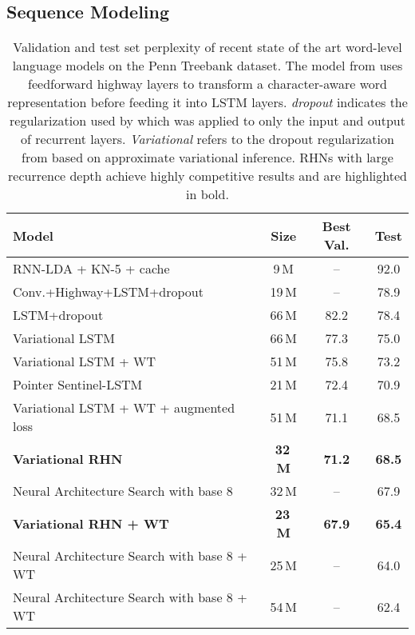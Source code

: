 \documentclass[letterpaper]{article}
\begin{document}
\subsection{Sequence Modeling}
\begin{table*}[t]
\centering
      \caption{Validation and test set perplexity of recent state of the art word-level language models on the Penn Treebank dataset. The model from \citet{kim2015} uses feedforward highway layers to transform a character-aware word representation before feeding it into LSTM layers. \emph{dropout} indicates the regularization used by \citet{zaremba} which was applied to only the input and output of recurrent layers. \emph{Variational} refers to the dropout regularization from \citet{gal2015} based on approximate variational inference. RHNs with large recurrence depth achieve highly competitive results and are highlighted in bold.}
      \vspace{2mm}
      \label{tab:sota-ptb}
      {\small
      \begin{tabular}{lccc}
        \toprule
        \textbf{Model} & \textbf{Size}  & \textbf{Best Val.} & \textbf{Test} \\ 
        \midrule
        RNN-LDA + KN-5 + cache \citep{mikolov2012context} & 9\,M & -- & 92.0 \\
        Conv.+Highway+LSTM+dropout \citep{kim2015} & 19\,M  & --    & 78.9\\
        LSTM+dropout \citep{zaremba}           & 66\,M  & 82.2  & 78.4\\ 
        Variational LSTM \citep{gal2015}       & 66\,M  & 77.3  & 75.0\\
        Variational LSTM + WT \citep{weight_tying} & 51\,M & 75.8 & 73.2 \\
        Pointer Sentinel-LSTM \citep{pointer_sentinel_salesforce} & 21\,M & 72.4 & 70.9\\
Variational LSTM + WT + augmented loss \citep{augmenting_loss_inan_khosravi} & 51\,M & 71.1 & 68.5 \\
        \textbf{Variational RHN}              & \textbf{32\,M} & \textbf{71.2} & \textbf{68.5}\\
        Neural Architecture Search with base 8 \citep{zoph2016neural}              & 32\,M & -- & 67.9\\
        \textbf{Variational RHN + WT}              & \textbf{23\,M} & \textbf{67.9} & \textbf{65.4}\\

        Neural Architecture Search with base 8 + WT \citep{zoph2016neural}              & 25\,M & -- & 64.0\\
        Neural Architecture Search with base 8 + WT \citep{zoph2016neural}              & 54\,M & -- & 62.4\\
        \bottomrule
      \end{tabular}}
\end{table*}
\end{document}
